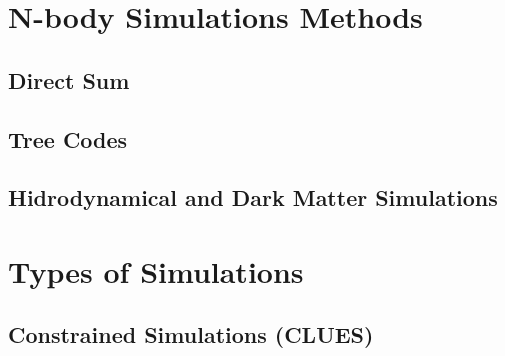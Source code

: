\section{N-body Simulations Methods}
\label{sec:N-bodySimulationsMethods}


	\subsection{Direct Sum}
	\label{subsec:DirectSum}


	\subsection{Tree Codes}
	\label{subsec:TreeCodes}


	\subsection{Hidrodynamical and Dark Matter Simulations}
	\label{subsec:HidrodynamicalAndDarkMatterSimulations}






\section{Types of Simulations}
\label{sec:Types of Simulations}


	\subsection{Constrained Simulations (CLUES)}
	\label{subsec:ConstrainedSimulations}


